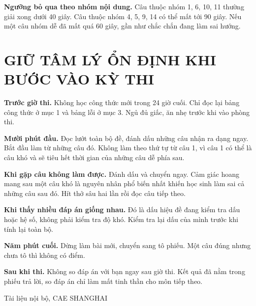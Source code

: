 \documentclass[11pt, a4paper]{article}
\begin{document}
\textbf{Ngưỡng bỏ qua theo nhóm nội dung.} Câu thuộc nhóm 1, 6, 10, 11 thường giải xong dưới 40 giây. Câu thuộc nhóm 4, 5, 9, 14 có thể mất tới 90 giây. Nếu một câu nhóm dễ đã mất quá 60 giây, gần như chắc chắn đang làm sai hướng.

\section{GIỮ TÂM LÝ ỔN ĐỊNH KHI BƯỚC VÀO KỲ THI}

\textbf{Trước giờ thi.} Không học công thức mới trong 24 giờ cuối. Chỉ đọc lại bảng công thức ở mục 1 và bảng lỗi ở mục 3. Ngủ đủ giấc, ăn nhẹ trước khi vào phòng thi.

\textbf{Mười phút đầu.} Đọc lướt toàn bộ đề, đánh dấu những câu nhận ra dạng ngay. Bắt đầu làm từ những câu đó. Không làm theo thứ tự từ câu 1, vì câu 1 có thể là câu khó và sẽ tiêu hết thời gian của những câu dễ phía sau.

\textbf{Khi gặp câu không làm được.} Đánh dấu và chuyển ngay. Cảm giác hoang mang sau một câu khó là nguyên nhân phổ biến nhất khiến học sinh làm sai cả những câu sau đó. Hít thở sâu hai lần rồi đọc câu tiếp theo.

\textbf{Khi thấy nhiều đáp án giống nhau.} Đó là dấu hiệu đề đang kiểm tra dấu hoặc hệ số, không phải kiểm tra độ khó. Kiểm tra lại dấu của mình trước khi tính lại toàn bộ.

\textbf{Năm phút cuối.} Dừng làm bài mới, chuyển sang tô phiếu. Một câu đúng nhưng chưa tô thì không có điểm.

\textbf{Sau khi thi.} Không so đáp án với bạn ngay sau giờ thi. Kết quả đã nằm trong phiếu trả lời, so đáp án chỉ làm mất tinh thần cho môn tiếp theo.
\vspace{0.8cm}
\begin{center}
{\footnotesize\color{cae_blue} Tài liệu nội bộ, CAE SHANGHAI}
\end{center}
\end{document}
